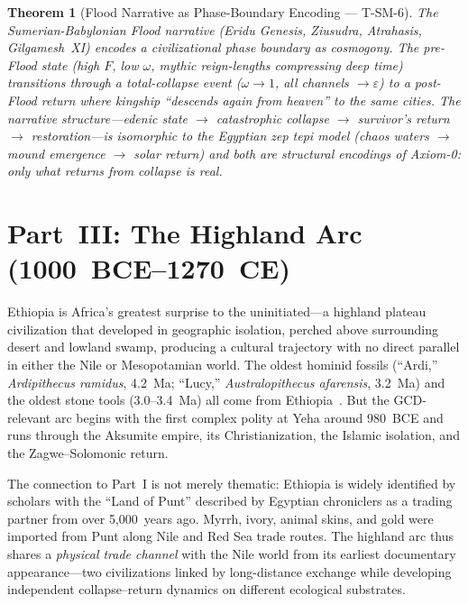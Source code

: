 \documentclass[
  aps,
  prd,
  twocolumn,
  superscriptaddress,
  nofootinbib,
  floatfix
]{revtex4-2}
\newtheorem{theorem}{Theorem}
\newcommand{\eps}{\varepsilon}
\begin{document}
\begin{theorem}[Flood Narrative as Phase-Boundary
Encoding --- T-SM-6]\label{thm:flood}
The Sumerian-Babylonian Flood narrative (Eridu Genesis,
Ziusudra, Atrahasis, Gilgamesh~XI) encodes a
civilizational phase boundary as cosmogony.  The
pre-Flood state (high $F$, low $\omega$, mythic
reign-lengths compressing deep time) transitions
through a total-collapse event ($\omega \to 1$,
all channels $\to \eps$) to a post-Flood return
where kingship ``descends again from heaven'' to
the same cities.  The narrative structure---edenic
state $\to$ catastrophic collapse $\to$ survivor's
return $\to$ restoration---is isomorphic to the
Egyptian \emph{zep tepi} model
(chaos waters $\to$ mound emergence $\to$ solar
return) and both are structural encodings of
Axiom-0: only what returns from collapse is real.
\end{theorem}


\section{Part~III: The Highland Arc
(1000~BCE--1270~CE)}\label{sec:ethiopia}

Ethiopia is Africa's greatest surprise to the
uninitiated---a highland plateau civilization that
developed in geographic isolation, perched above
surrounding desert and lowland swamp, producing a
cultural trajectory with no direct parallel in either
the Nile or Mesopotamian world.  The oldest hominid
fossils (``Ardi,'' \emph{Ardipithecus ramidus},
4.2~Ma; ``Lucy,'' \emph{Australopithecus afarensis},
3.2~Ma) and the oldest stone tools (3.0--3.4~Ma) all
come from Ethiopia~\cite{phillipson2012aksum}.  But
the GCD-relevant arc begins with the first complex
polity at Yeha around 980~BCE and runs through the
Aksumite empire, its Christianization, the Islamic
isolation, and the Zagwe--Solomonic return.

The connection to Part~I is not merely thematic:
Ethiopia is widely identified by scholars with the
``Land of Punt'' described by Egyptian chroniclers as
a trading partner from over 5,000~years ago.  Myrrh,
ivory, animal skins, and gold were imported from Punt
along Nile and Red Sea trade routes.  The highland arc
thus shares a \emph{physical trade channel} with the
Nile world from its earliest documentary
appearance---two civilizations linked by
long-distance exchange while developing independent
collapse--return dynamics on different ecological
substrates.
\end{document}
